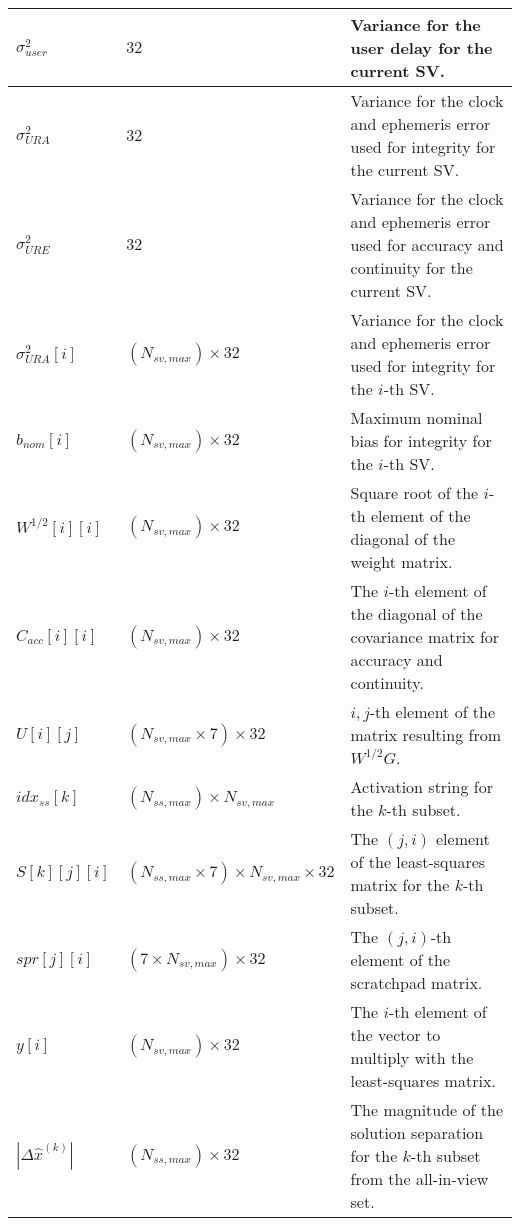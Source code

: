 \documentclass[11pt]{article}
\begin{document}
\begin{table}[htbp]
\begin{center}
\begin{tabular}{|m{1.5cm}|m{2.5cm}|m{7cm}|}
    $\sigma_{user}^2$ & $32$ & Variance for the user delay for the current SV.\\ \hline

    $\sigma_{URA}^2$ & $32$ & Variance for the clock and ephemeris error used for integrity for the current SV.\\ \hline

    $\sigma_{URE}^2$ & $32$ & Variance for the clock and ephemeris error used for accuracy and continuity for the current SV.\\ \hline

    $\sigma_{URA}^2[i]$ & $(N_{sv,max}) \times 32$ & Variance for the clock and ephemeris error used for integrity for the $i$-th SV.\\ \hline

    $b_{nom}[i]$ & $(N_{sv,max}) \times 32$ & Maximum nominal bias for integrity for the $i$-th SV.\\ \hline

    $W^{1/2}[i][i]$ & $(N_{sv,max}) \times 32$ & Square root of the $i$-th element of the diagonal of the weight matrix.\\ \hline

    $C_{acc}[i][i]$ & $(N_{sv,max}) \times 32$ & The $i$-th element of the diagonal of the covariance matrix for accuracy and continuity.\\ \hline

    $U[i][j]$ & $(N_{sv,max} \times 7) \times 32$ & $i,j$-th element of the matrix resulting from $W^{1/2}G$.\\ \hline

    $idx_{ss}[k]$ & $(N_{ss,max}) \times N_{sv,max}$ & Activation string for the $k$-th subset.\\ \hline

    $S[k][j][i]$ & $(N_{ss,max} \times 7) \times N_{sv,max} \times 32$ & The $(j,i)$ element of the least-squares matrix for the $k$-th subset.\\ \hline

    $spr[j][i]$ & $(7 \times N_{sv,max}) \times 32$ & The $(j,i)$-th element of the scratchpad matrix.\\ \hline

    $y[i]$ & $(N_{sv,max}) \times 32$ & The $i$-th element of the vector to multiply with the least-squares matrix.\\ \hline

    $|\Delta\hat{x}^{(k)}|$ & $(N_{ss,max}) \times 32$ & The magnitude of the solution separation for the $k$-th subset from the all-in-view set.\\ \hline


\end{tabular}
\end{center}
\end{table}
\end{document}
